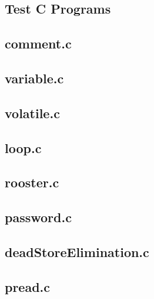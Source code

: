 
\onecolumn
\begin{appendices}
\section{Test C Programs}
\label{app:testPrograms}

\subsection{comment.c}


\subsection{variable.c}


\subsection{volatile.c}


\subsection{loop.c}


\subsection{rooster.c}


\subsection{password.c}


\subsection{deadStoreElimination.c}


\subsection{pread.c}



\end{appendices}
